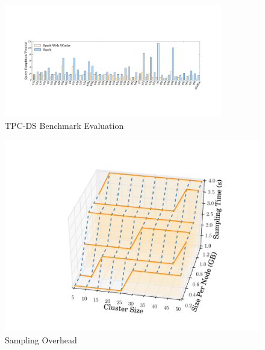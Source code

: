 \begin{figure}
	\includegraphics[width=0.85\textwidth]{fig/tpcds}
	\caption{TPC-DS Benchmark Evaluation}
	\label{fig:tpcds}
	\vspace{-1em}
\end{figure}
\begin{figure}
	\centering
	\includegraphics[width=0.6\linewidth]{fig/sampling}
	\caption{Sampling Overhead}
	\label{fig:sampling}
	\vspace{-1em}
\end{figure}

